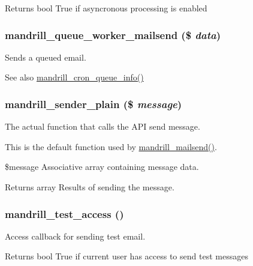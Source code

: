 \begin{DoxyReturn}{Returns}
bool True if asyncronous processing is enabled 
\end{DoxyReturn}
\hypertarget{mandrill_8module_adc065b54dd9fd629c7eed56053c09cbd}{
\subsubsection[{mandrill\_\-queue\_\-worker\_\-mailsend}]{\setlength{\rightskip}{0pt plus 5cm}mandrill\_\-queue\_\-worker\_\-mailsend (\$ {\em data})}}
\label{mandrill_8module_adc065b54dd9fd629c7eed56053c09cbd}
Sends a queued email. \begin{DoxySeeAlso}{See also}
\hyperlink{mandrill_8module_aef3727ae488149f312f6951a77bbf7a9}{mandrill\_\-cron\_\-queue\_\-info()} 
\end{DoxySeeAlso}
\hypertarget{mandrill_8module_a654d06cf1990571093c1d45e64267ada}{
\subsubsection[{mandrill\_\-sender\_\-plain}]{\setlength{\rightskip}{0pt plus 5cm}mandrill\_\-sender\_\-plain (\$ {\em message})}}
\label{mandrill_8module_a654d06cf1990571093c1d45e64267ada}
The actual function that calls the API send message.

This is the default function used by \hyperlink{mandrill_8module_a3491d792be9e5ad28ca92986f432f23e}{mandrill\_\-mailsend()}.

\$message Associative array containing message data.

\begin{DoxyReturn}{Returns}
array Results of sending the message. 
\end{DoxyReturn}
\hypertarget{mandrill_8module_ada3040c948095cdcd2386200335168e7}{
\subsubsection[{mandrill\_\-test\_\-access}]{\setlength{\rightskip}{0pt plus 5cm}mandrill\_\-test\_\-access ()}}
\label{mandrill_8module_ada3040c948095cdcd2386200335168e7}
Access callback for sending test email.

\begin{DoxyReturn}{Returns}
bool True if current user has access to send test messages 
\end{DoxyReturn}
